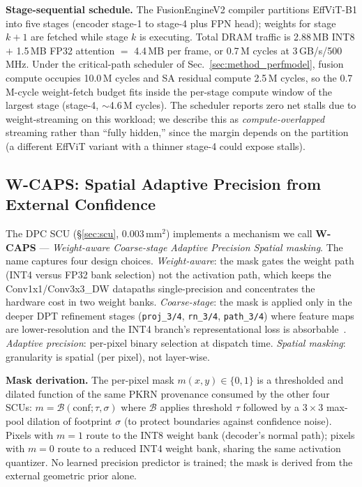 \documentclass[journal]{IEEEtran}
\begin{document}
\textbf{Stage-sequential schedule.} The FusionEngineV2 compiler partitions EffViT-B1 into five stages (encoder stage-1 to stage-4 plus FPN head); weights for stage $k{+}1$ are fetched while stage $k$ is executing. Total DRAM traffic is 2.88\,MB INT8 $+$ 1.5\,MB FP32 attention $=$ 4.4\,MB per frame, or 0.7\,M cycles at 3\,GB/s/500\,MHz. Under the critical-path scheduler of Sec.~\ref{sec:method_perfmodel}, fusion compute occupies 10.0\,M cycles and SA residual compute 2.5\,M cycles, so the 0.7\,M-cycle weight-fetch budget fits inside the per-stage compute window of the largest stage (stage-4, $\sim$4.6\,M cycles). The scheduler reports zero net stalls due to weight-streaming on this workload; we describe this as \emph{compute-overlapped} streaming rather than ``fully hidden,'' since the margin depends on the partition (a different EffViT variant with a thinner stage-4 could expose stalls).

\subsection{W-CAPS: Spatial Adaptive Precision from External Confidence}
\label{sec:wcaps}

The DPC SCU (\S\ref{sec:scu}, 0.003\,mm$^2$) implements a mechanism we call \textbf{W-CAPS} --- \emph{Weight-aware Coarse-stage Adaptive Precision Spatial masking}. The name captures four design choices. \emph{Weight-aware}: the mask gates the weight path (INT4 versus FP32 bank selection) not the activation path, which keeps the Conv1x1/Conv3x3\_DW datapaths single-precision and concentrates the hardware cost in two weight banks. \emph{Coarse-stage}: the mask is applied only in the deeper DPT refinement stages (\texttt{proj\_3/4}, \texttt{rn\_3/4}, \texttt{path\_3/4}) where feature maps are lower-resolution and the INT4 branch's representational loss is absorbable~\cite{facil2019camconvs}. \emph{Adaptive precision}: per-pixel binary selection at dispatch time. \emph{Spatial masking}: granularity is spatial (per pixel), not layer-wise.

\textbf{Mask derivation.} The per-pixel mask $m(x,y) \in \{0,1\}$ is a thresholded and dilated function of the same PKRN provenance consumed by the other four SCUs: $m = \mathcal{B}(\mathrm{conf}; \tau, \sigma)$ where $\mathcal{B}$ applies threshold $\tau$ followed by a $3{\times}3$ max-pool dilation of footprint $\sigma$ (to protect boundaries against confidence noise). Pixels with $m{=}1$ route to the INT8 weight bank (decoder's normal path); pixels with $m{=}0$ route to a reduced INT4 weight bank, sharing the same activation quantizer. No learned precision predictor is trained; the mask is derived from the external geometric prior alone.
\end{document}
